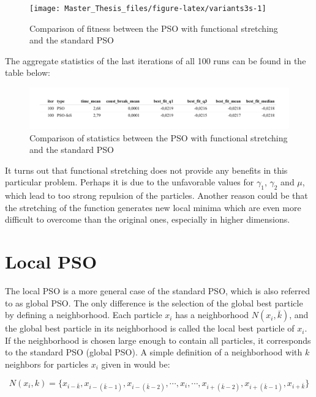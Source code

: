 \documentclass[
  oneside, a4paper, 12pt, openany]{book}
\theoremstyle{definition}
\theoremstyle{definition}
\theoremstyle{definition}
\theoremstyle{definition}
\theoremstyle{remark}
\begin{document}
\begin{figure}[H]
\texttt{[image: Master\_Thesis\_files/figure-latex/variants3s-1]} \caption{Comparison of fitness between the PSO with functional stretching and the standard PSO}\label{fig:variants3s}
\end{figure}

The aggregate statistics of the last iterations of all 100 runs can be found in the table below:

\begin{figure}[H]
\includegraphics{Master_Thesis_files/figure-latex/variants4-1} \caption{Comparison of statistics between the PSO with functional stretching and the standard PSO}\label{fig:variants4}
\end{figure}

It turns out that functional stretching does not provide any benefits in this particular problem. Perhaps it is due to the unfavorable values for \(\gamma_1\), \(\gamma_2\) and \(\mu\), which lead to too strong repulsion of the particles. Another reason could be that the stretching of the function generates new local minima which are even more difficult to overcome than the original ones, especially in higher dimensions.

\hypertarget{local-pso}{%
\section{Local PSO}\label{local-pso}}

The local PSO is a more general case of the standard PSO, which is also referred to as global PSO. The only difference is the selection of the global best particle by defining a neighborhood. Each particle \(x_i\) has a neighborhood \(N(x_i, \bar{k})\), and the global best particle in its neighborhood is called the local best particle of \(x_i\). If the neighborhood is chosen large enough to contain all particles, it corresponds to the standard PSO (global PSO). A simple definition of a neighborhood with \(k\) neighbors for particles \(x_i\) given in \citep{Enge2013} would be:

\[
  N(x_i, k) = \{ x_{i-\bar{k}}, x_{i-(\bar{k}-1)}, x_{i-(\bar{k}-2)}, \cdots, x_{i}, \cdots, x_{i+(\bar{k}-2)}, x_{i+(\bar{k}-1)}, x_{i+\bar{k}} \}
\]
\end{document}

